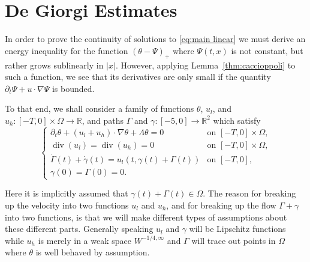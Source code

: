 \documentclass[11pt]{amsart}
\theoremstyle{remark}
\theoremstyle{definition}
\newcommand{\R}{\mathbb{R}}
\newcommand{\paren}[1]{\left( #1 \right)}
\newcommand{\del}{\partial}
\newcommand{\grad}{\nabla}
\renewcommand{\div}{\operatorname{div}}
\newcommand{\ulow}{u_l}
\newcommand{\uhigh}{u_h}
\begin{document}

\section{De Giorgi Estimates} \label{sec:de giorgi}

In order to prove the continuity of solutions to \eqref{eq:main linear} we must derive an energy inequality for the function $\paren{\theta - \Psi}_+$ where $\Psi(t,x)$ is not constant, but rather grows sublinearly in $|x|$.  However, applying Lemma~\ref{thm:caccioppoli} to such a function, we see that its derivatives are only small if the quantity $\del_t \Psi + u \cdot \grad\Psi$ is bounded.  

To that end, we shall consider a family of functions $\theta$, $\ulow$, and $\uhigh:[-T,0]\times \Omega \to \R$, and paths $\Gamma$ and $\gamma:[-5,0] \to \R^2$ which satisfy
\begin{equation} \label{eq:main linear brokendown} \begin{cases}
\del_t \theta + (\ulow + \uhigh) \cdot \grad \theta + \Lambda \theta = 0 & \textrm{on } [-T,0] \times \Omega, \\
\div( \ulow) = \div(\uhigh) = 0 & \textrm{on } [-T,0]\times \Omega, \\
\dot{\Gamma}(t) + \dot{\gamma}(t) = \ulow(t, \gamma(t) + \Gamma(t)) & \textrm{on } [-T,0], \\
\gamma(0) = \Gamma(0) = 0.
\end{cases} \end{equation}

Here it is implicitly assumed that $\gamma(t) + \Gamma(t) \in \Omega$.  The reason for breaking up the velocity into two functions $\ulow$ and $\uhigh$, and for breaking up the flow $\Gamma + \gamma$ into two functions, is that we will make different types of assumptions about these different parts.  Generally speaking $\ulow$ and $\gamma$ will be Lipschitz functions while $\uhigh$ is merely in a weak space $W^{-1/4,\infty}$ and $\Gamma$ will trace out points in $\Omega$ where $\theta$ is well behaved by assumption.  
\end{document}
